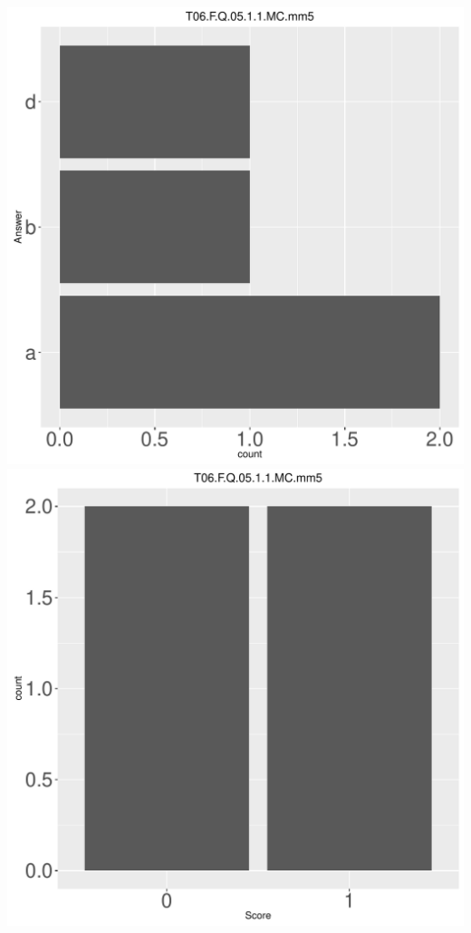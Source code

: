 \documentclass[12pt,english,nohyper]{tufte-handout}\usepackage[]{graphicx}\usepackage[]{color}
\begin{document}
\begin{center} \includegraphics[width=.45\linewidth]{Topic06_AB_65_answer} \includegraphics[width=.45\linewidth]{Topic06_AB_65_score} \end{center} 
\end{document}
